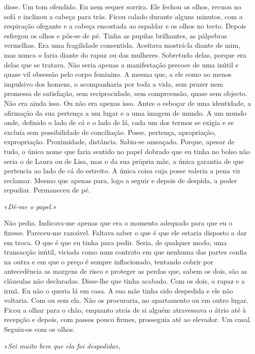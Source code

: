 disse. Um tom ofendido. Eu nem sequer sorrira. Ele fechou os olhos,
recuou no sofá e inclinou a cabeça para trás. Ficou calado durante
alguns minutos, com a respiração ofegante e a cabeça encostada ao
espaldar e os olhos no tecto. Depois esfregou os olhos e pôs­‑se de pé.
Tinha as pupilas brilhantes, as pálpebras vermelhas. Era uma fragilidade
consentida. Aceitava mostrá­‑la diante de mim, mas nunca o faria diante
do rapaz ou das mulheres. Sobretudo delas, porque era delas que se
tratava. Não seria apenas a manifestação precoce de uma inútil e quase
vil obsessão pelo corpo feminino. A mesma que, a ele como ao menos
impulsivo dos homens, o acompanharia por toda a vida, sem prazer nem
promessa de satisfação, sem reciprocidade, sem compreensão, quase sem
objecto. Não era ainda isso. Ou não era apenas isso. Antes o esboçar de
uma identidade, a afirmação da sua pertença a um lugar e a uma imagem de
mundo. A um mundo onde, definido o lado de cá e o lado de lá, cada um
dos termos se exigia e se excluía sem possibilidade de conciliação.
Posse, pertença, apropriação, expropriação. Proximidade, distância.
Sabia­‑se ameaçado. Porque, apesar de tudo, o único nome que faria
sentido no papel dobrado que eu tinha no bolso não seria o de Laura ou
de Lisa, mas o da sua própria mãe, a única garantia de que pertencia ao
lado de cá do estreito. A única coisa cuja posse valeria a pena vir
reclamar. Mesmo que apenas para, logo a seguir e depois de despida, a
poder repudiar. Permaneceu de pé.

«\emph{Dê­‑me o papel.}»

Não pedia. Indicava­‑me apenas que era o momento adequado para que eu o
fizesse. Pareceu­‑me razoável. Faltava saber o que é que ele estaria
disposto a dar em troca. O que é que eu tinha para pedir. Seria, de
qualquer modo, uma transacção inútil, viciada como num contrato em que
nenhuma das partes confia na outra e em que o preço é sempre
inflacionado, tentando cobrir por antecedência as margens de risco e
proteger as perdas que, sabem os dois, são as cláusulas não declaradas.
Disse­‑lhe que tinha acabado. Com os dois, o rapaz e a irmã. Eu não o
queria lá em casa. A sua mãe tinha sido despedida e ele não voltaria.
Com ou sem ela. Não os procuraria, no apartamento ou em outro lugar.
Ficou a olhar para o chão, enquanto atrás de si alguém atravessava o
átrio até à recepção e depois, com passos pouco firmes, prosseguia até
ao elevador. Um casal. Seguiu­‑os com os olhos.

«\emph{Sei muito bem que ela foi despedida}»,

